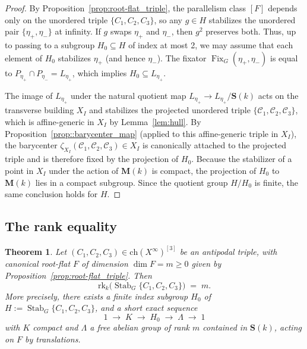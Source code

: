 \documentclass[11pt]{amsart}
\newcommand{\rk}{\mathrm{rk}}
\newcommand{\bfS}{\mathbf{S}}
\newcommand{\Ch}{\mathrm{ch}}
\DeclareMathOperator{\Stab}{Stab}
\theoremstyle{plain}
\newtheorem{thm}{Theorem}[section]
\theoremstyle{definition}
\theoremstyle{remark}
\begin{document}
	\begin{proof}		
		By Proposition~\ref{prop:root-flat_triple}, the parallelism class $[F]$ depends only on the unordered triple $\{C_1,C_2,C_3\}$, so any $g\in H$ stabilizes the unordered pair $\{\eta_+,\eta_-\}$ at infinity. If $g$ swaps $\eta_+$ and $\eta_-$, then $g^2$ preserves both. Thus, up to passing to a subgroup $H_0\subseteq H$ of index at most 2, we may assume that each element of $H_0$ stabilizes $\eta_+$ (and hence $\eta_-$). The fixator $\operatorname{Fix}_G(\eta_+,\eta_-)$ is equal to $P_{\eta_+}\cap P_{\eta_-}=L_{\eta_+}$, which implies $H_0\subseteq L_{\eta_+}$.

The image of $L_{\eta_+}$ under the natural quotient map $L_{\eta_+}\to L_{\eta_+}/\mathbf{S}(k)$ acts on the transverse building $X_I$ and stabilizes the projected unordered triple $\{\mathcal{C}_1,\mathcal{C}_2,\mathcal{C}_3\}$, which is affine-generic in $X_I$ by Lemma~\ref{lem:hull}. By Proposition~\ref{prop::barycenter_map} (applied to this affine-generic triple in $X_I$), the barycenter $\zeta_{X_I}(\mathcal{C}_1,\mathcal{C}_2,\mathcal{C}_3)\in X_I$ is canonically attached to the projected triple and is therefore fixed by the projection of $H_0$. Because the stabilizer of a point in $X_I$ under the action of $\mathbf{M}(k)$ is compact, the projection of $H_0$ to $\mathbf{M}(k)$ lies in a compact subgroup. Since the quotient group $H/H_0$ is finite, the same conclusion holds for $H$.
	\end{proof}
	
	\subsection{The rank equality}
	
	\begin{thm}\label{thm:rank}
		Let $(C_1,C_2,C_3)\in\Ch(X^\infty)^{[3]}$ be an antipodal triple, with canonical root-flat $F$ of dimension $\dim F=m \geq 0$ given by Proposition~\ref{prop:root-flat_triple}. Then
		\[
		\rk_k \bigl(\Stab_{G}\{C_1,C_2,C_3\}\bigr) \;=\; m.
		\]
		More precisely, there exists a finite index subgroup $H_0$ of $H:= \Stab_{G}\{C_1,C_2,C_3\}$, and a short exact sequence
		\[
		1 \;\longrightarrow\; K \;\longrightarrow\; H_0 \;\longrightarrow\; \Lambda \;\longrightarrow\; 1
		\]
		with $K$ compact and $\Lambda$ a free abelian group of rank $m$ contained in $\bfS(k)$, acting on $F$ by translations.
	\end{thm}
	
\end{document}
